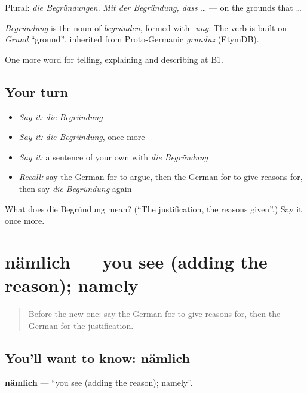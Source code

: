 Plural: \emph{die Begründungen}. \emph{Mit der Begründung, dass …} — on the grounds that …

\begin{cousinweb}
\emph{Begründung} is the noun of \emph{begründen}, formed with \emph{-ung}. The verb is built on \emph{Grund} \textquotedblleft{}ground\textquotedblright{}, inherited from Proto-Germanic \emph{grunduz} (EtymDB).
\end{cousinweb}

\begin{grammarlens}[title={What you've built}]
One more word for telling, explaining and describing at B1.
\end{grammarlens}

\subsection*{Your turn}
\begin{itemize}
\raggedright
  \item \emph{Say it:} \emph{die Begründung}
  \item \emph{Say it:} \emph{die Begründung}, once more
  \item \emph{Say it:} a sentence of your own with \emph{die Begründung}
  \item \emph{Recall:} say the German for to argue, then the German for to give reasons for, then say \emph{die Begründung} again
\end{itemize}

\begin{tcolorbox}[breakable,colback=teal!4,colframe=teal!35!black,title={Before you move on}]
What does die Begründung mean? (\textquotedblleft{}The justification, the reasons given\textquotedblright{}.) Say it once more.
\end{tcolorbox}
\section[nämlich]{nämlich — you see (adding the reason); namely}

\label{lesson:GE-C332-naemlich}



\begin{quote}
Before the new one: say the German for to give reasons for, then the German for the justification.
\end{quote}

\subsection*{You'll want to know: nämlich}
\textbf{nämlich} — \textquotedblleft{}you see (adding the reason); namely\textquotedblright{}.

